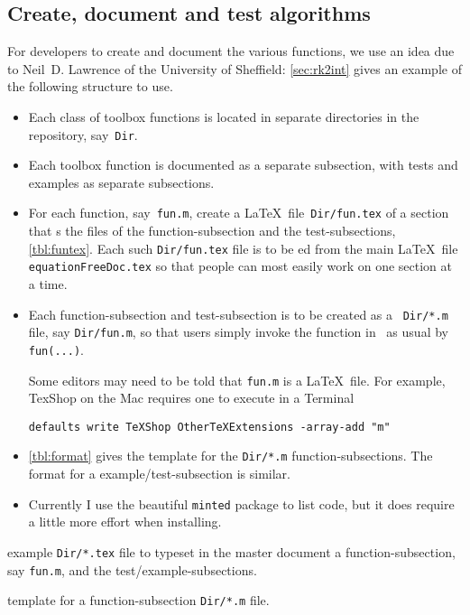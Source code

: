 \subsection{Create, document and test algorithms}

For developers to create and document the various functions, we use an idea due to Neil~D. Lawrence of the University of Sheffield:
\autoref{sec:rk2int} gives an example of the following structure to use.

\begin{itemize}
\item Each class of toolbox functions is located in separate directories in the repository, say~\verb|Dir|.

\item Each toolbox function is documented as a separate subsection, with tests and examples as separate subsections.

\item For each function, say~\verb|fun.m|, create a \LaTeX\ file~\verb|Dir/fun.tex| of a section that \verb||s the  files of the function-subsection and the test-subsections, \autoref{tbl:funtex}.
Each such \verb|Dir/fun.tex| file is to be \verb||ed from the main \LaTeX\ file \verb|equationFreeDoc.tex| so that people can most easily work on one section at a time.  

\item Each function-subsection and test-subsection is to be created as a \script\ \verb|Dir/*.m| file, say \verb|Dir/fun.m|, so that users simply invoke the function in \script\ as usual by \verb|fun(...)|.

Some editors may need to be told that \verb|fun.m| is a \LaTeX\ file.  For example, TexShop on the Mac requires one to execute in a Terminal
\begin{verbatim}
defaults write TeXShop OtherTeXExtensions -array-add "m"
\end{verbatim}

\item \autoref{tbl:format} gives the template for the \verb|Dir/*.m| function-subsections.
The format for a example\slash test-subsection is similar.

\item Currently I use the beautiful \verb|minted| package to list code, but it does require a little more effort when installing.

\end{itemize}

\begin{table}\small
\caption{\label{tbl:funtex}example \texttt{Dir/*.tex} file to typeset in the master document a function-subsection, say \texttt{fun.m}, and the test\slash example-subsections.}

\caption{\label{tbl:format}template for a function-subsection \texttt{Dir/*.m} file.}

\end{table}


